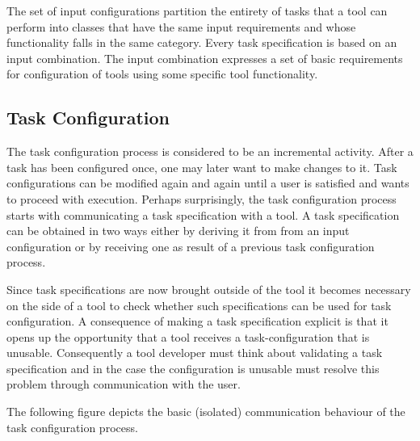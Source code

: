 \documentclass{article}
\begin{document}
   The set of input configurations partition the entirety of tasks that a tool
   can perform into classes that have the same input requirements and whose
   functionality falls in the same category. Every task specification is based
   on an input combination. The input combination expresses a set of basic
   requirements for configuration of tools using some specific tool
   functionality.
   

  \subsection{Task Configuration} \label{ss::task_configuration}


   The task configuration process is considered to be an incremental activity.
   After a task has been configured once, one may later want to make changes to
   it.  Task configurations can be modified again and again until a user is
   satisfied and wants to proceed with execution. Perhaps surprisingly, the
   task configuration process starts with communicating a task specification 
   with a tool. A task specification can be obtained in two ways either by
   deriving it from from an input configuration or by receiving one as result
   of a previous task configuration process.
   
   Since task specifications are now brought outside of the tool it becomes
   necessary on the side of a tool to check whether such specifications can be
   used for task configuration. A consequence of making a task specification 
   explicit is that it opens up the opportunity that a tool receives a
   task-configuration that is unusable. Consequently a tool developer must
   think about validating a task specification and in the case the
   configuration is unusable must resolve this problem through communication
   with the user.

   The following figure depicts the basic (isolated) communication behaviour of
   the task configuration process.
   
\end{document}
